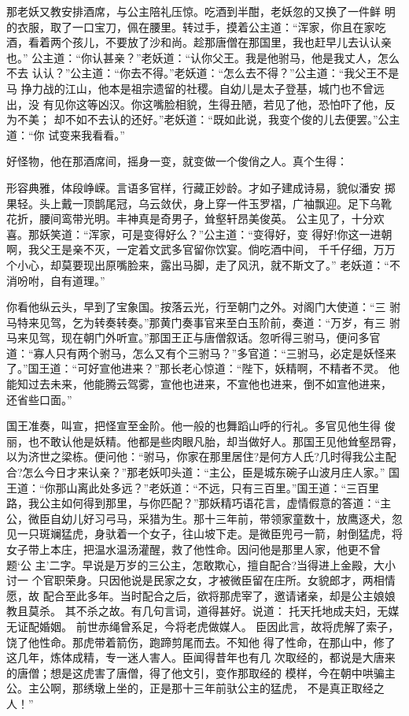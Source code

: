 那老妖又教安排酒席，与公主陪礼压惊。吃酒到半酣，老妖忽的又换了一件鲜
明的衣服，取了一口宝刀，佩在腰里。转过手，摸着公主道：“浑家，你且在家吃
酒，看着两个孩儿，不要放了沙和尚。趁那唐僧在那国里，我也赶早儿去认认亲也。”
公主道：“你认甚亲？”老妖道：“认你父王。我是他驸马，他是我丈人，怎么不去
认认？”公主道：“你去不得。”老妖道：“怎么去不得？”公主道：“我父王不是马
挣力战的江山，他本是祖宗遗留的社稷。自幼儿是太子登基，城门也不曾远出，没
有见你这等凶汉。你这嘴脸相貌，生得丑陋，若见了他，恐怕吓了他，反为不美；
却不如不去认的还好。”老妖道：“既如此说，我变个俊的儿去便罢。”公主道：“你
试变来我看看。”

好怪物，他在那酒席间，摇身一变，就变做一个俊俏之人。真个生得：

形容典雅，体段峥嵘。言语多官样，行藏正妙龄。才如子建成诗易，貌似潘安
掷果轻。头上戴一顶鹊尾冠，乌云敛伏，身上穿一件玉罗褶，广袖飘迎。足下乌靴
花折，腰间鸾带光明。丰神真是奇男子，耸壑轩昂美俊英。
公主见了，十分欢喜。那妖笑道：“浑家，可是变得好么？”公主道：“变得好，变
得好!你这一进朝啊，我父王是亲不灭，一定着文武多官留你饮宴。倘吃酒中间，
千千仔细，万万个小心，却莫要现出原嘴脸来，露出马脚，走了风汛，就不斯文了。”
老妖道：“不消吩咐，自有道理。”

你看他纵云头，早到了宝象国。按落云光，行至朝门之外。对阁门大使道：“三
驸马特来见驾，乞为转奏转奏。”那黄门奏事官来至白玉阶前，奏道：“万岁，有三
驸马来见驾，现在朝门外听宣。”那国王正与唐僧叙话。忽听得三驸马，便问多官
道：“寡人只有两个驸马，怎么又有个三驸马？”多官道：“三驸马，必定是妖怪来
了。”国王道：“可好宣他进来？”那长老心惊道：“陛下，妖精啊，不精者不灵。
他能知过去未来，他能腾云驾雾，宣他也进来，不宣他也进来，倒不如宣他进来，
还省些口面。”

国王准奏，叫宣，把怪宣至金阶。他一般的也舞蹈山呼的行礼。多官见他生得
俊丽，也不敢认他是妖精。他都是些肉眼凡胎，却当做好人。那国王见他耸壑昂霄，
以为济世之梁栋。便问他：“驸马，你家在那里居住?是何方人氏?几时得我公主配
合?怎么今日才来认亲？”那老妖叩头道：“主公，臣是城东碗子山波月庄人家。”
国王道：“你那山离此处多远？”老妖道：“不远，只有三百里。”国王道：“三百里
路，我公主如何得到那里，与你匹配？”那妖精巧语花言，虚情假意的答道：“主
公，微臣自幼儿好习弓马，采猎为生。那十三年前，带领家童数十，放鹰逐犬，忽
见一只斑斓猛虎，身驮着一个女子，往山坡下走。是微臣兜弓一箭，射倒猛虎，将
女子带上本庄，把温水温汤灌醒，救了他性命。因问他是那里人家，他更不曾题‘公
主’二字。早说是万岁的三公主，怎敢欺心，擅自配合?当得进上金殿，大小讨一
个官职荣身。只因他说是民家之女，才被微臣留在庄所。女貌郎才，两相情愿，故
配合至此多年。当时配合之后，欲将那虎宰了，邀请诸亲，却是公主娘娘教且莫杀。
其不杀之故。有几句言词，道得甚好。说道：
托天托地成夫妇，无媒无证配婚姻。
前世赤绳曾系足，今将老虎做媒人。
臣因此言，故将虎解了索子，饶了他性命。那虎带着箭伤，跑蹄剪尾而去。不知他
得了性命，在那山中，修了这几年，炼体成精，专一迷人害人。臣闻得昔年也有几
次取经的，都说是大唐来的唐僧；想是这虎害了唐僧，得了他文引，变作那取经的
模样，今在朝中哄骗主公。主公啊，那绣墩上坐的，正是那十三年前驮公主的猛虎，
不是真正取经之人！”

